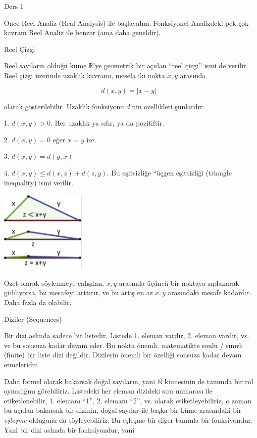 \documentclass[12pt,fleqn]{article}\usepackage{../../common}
\begin{document}
Ders 1 

Önce Reel Analiz (Real Analysis) ile başlayalım. Fonksiyonel Analizdeki pek
çok kavram Reel Analiz ile benzer (ama daha geneldir). 

Reel Çizgi 

Reel sayıların olduğu küme $\mathbb{R}$'ye geometrik bir açıdan ``reel
çizgi'' ismi de verilir. Reel çizgi üzerinde uzaklık kavramı, mesela iki
nokta $x,y$ arasında

$$ d(x,y) = |x - y| $$

olarak gösterilebilir. Uzaklık fonksiyonu $d$'nin özellikleri şunlardır:

1. $d(x,y) > 0$. Her uzaklık ya sıfır, ya da pozitiftir. 

2. $d(x,y) = 0$ eğer $x=y$ ise. 

3. $d(x,y) = d(y,x)$

4. $d(x,y) \le d(x,z) + d(z,y)$. Bu eşitsizliğe ``üçgen eşitsizliği
(triangle inequality) ismi verilir. 

\includegraphics[height=4cm]{1_03.png}

Özet olarak söylenmeye çalışılan, $x,y$ arasında üçüncü bir noktaya
zıplanarak gidiliyorsa, bu mesafeyi arttırır, ve bu artış en az $x,y$
arasındaki mesafe kadardır. Daha fazla da olabilir. 

Diziler (Sequences)

Bir dizi aslında sadece bir listedir. Listede 1. eleman vardır, 2. eleman
vardır, vs. ve bu sonsuza kadar devam eder. Bu nokta önemli, matematikte
sonlu / sınırlı (finite) bir liste dizi değildir. Dizilerin önemli bir
özelliği sonsuza kadar devam etmeleridir. 

Daha formel olarak bakarsak doğal sayıların, yani $\mathbb{N}$ kümesinin de
tanımda bir rol oynadığını görebiliriz. Listedeki her eleman dizideki sıra
numarası ile etiketlenebilir, 1. elemanı ``1'', 2. elemanı ``2'', vs. olarak
etiketleyebiliriz, o zaman bu açıdan bakarsak bir dizinin, doğal sayılar ile
başka bir küme arasındaki bir {\em eşleşme} olduğunu da söyleyebiliriz. Bu
eşleşme bir diğer tanımla bir fonksiyondur. Yani bir dizi aslında bir
fonksiyondur, yani
\end{document}
